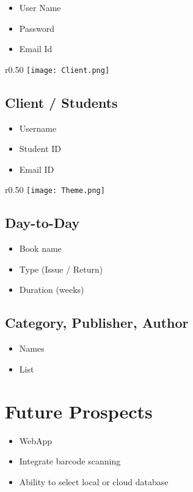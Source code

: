 \documentclass[landscape,a4paper,]{beamer}
\newcommand\myheading[1]{%
  \par\bigskip
  {\Large\bfseries#1}\par\smallskip}
\newcommand\mysubheading[1]{%
  \par\bigskip
  {\Medium\bfseries#1}\par\smallskip}
\begin{document}
\begin{itemize}
\item User Name
\item Password
\item Email Id
\end{itemize}

\begin{wrapfigure}{r}{0.50\textwidth}
    \texttt{[image: Client.png]}
    \label{fig:wrapfig}
\end{wrapfigure}

\subsection{Client / Students}
\label{sec:org8ca5e45}
\mysubheading{\insertsubsectionhead}


\begin{itemize}
\item Username
\item Student ID
\item Email ID
\end{itemize}

\begin{wrapfigure}{r}{0.50\textwidth}
    \texttt{[image: Theme.png]}
    \label{fig:wrapfig}
\end{wrapfigure}

\subsection{Day-to-Day}
\label{sec:org1c6a657}
\mysubheading{\insertsubsectionhead}

\begin{itemize}
\item Book name
\item Type (Issue / Return)
\item Duration (weeks)
\end{itemize}

\subsection{Category, Publisher, Author}
\label{sec:org2ea43dc}
\mysubheading{\insertsubsectionhead}


\begin{itemize}
\item Names
\item List
\end{itemize}

\section{Future Prospects}
\label{sec:org4d396ab}
\myheading{\insertsectionhead}
\begin{itemize}
\item WebApp
\item Integrate barcode scanning
\item Ability to select local or cloud database
\end{itemize}
\end{document}
